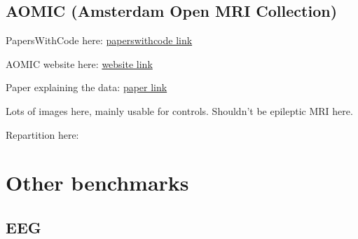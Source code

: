 \begin{table}[htbp]
	\centering
	\caption{Repartition in the benchmark of Br35H ()}
	\label{tab:br35h}
\end{table}

\subsection{AOMIC (Amsterdam Open MRI Collection)}
\label{sub:sec:aomic}

PapersWithCode here: \href{https://paperswithcode.com/dataset/aomic}{paperswithcode link}

AOMIC website here: \href{https://nilab-uva.github.io/AOMIC.github.io/}{website link}

Paper explaining the data: \href{https://www.nature.com/articles/s41597-021-00870-6}{paper link}

Lots of images here, mainly usable for controls. Shouldn't be epileptic MRI here.

Repartition here: 


\begin{table}[htbp]
	\centering
	\caption{Repartition in the benchmark of AOMIC ()}
	\label{tab:aomic}
\end{table}

\section{Other benchmarks}

\subsection{EEG}

